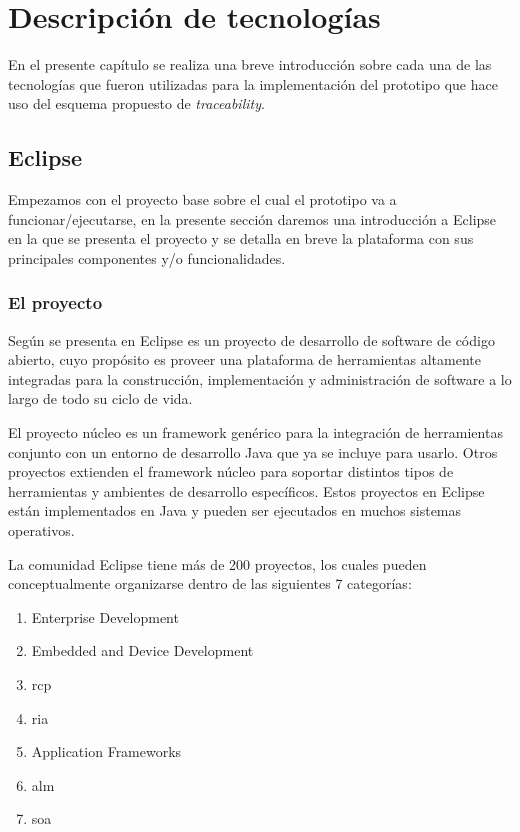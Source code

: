 \documentclass[a4paper,12pt,oneside,spanish]{book}
\begin{document}
\chapter{Descripción de tecnologías}

En el presente capítulo se realiza una breve introducción sobre cada una de las tecnologías que fueron utilizadas para la implementación del prototipo que hace uso del esquema propuesto de \textit{traceability}.


\section{Eclipse}

Empezamos con el proyecto base sobre el cual el prototipo va a funcionar/ejecutarse, en la presente sección daremos una introducción a Eclipse en la que se presenta el proyecto y se detalla en breve la plataforma con sus principales componentes y/o funcionalidades.


\subsection{El proyecto}

Según se presenta en \cite{EMFADG, Eclipse} Eclipse es un proyecto de desarrollo de software de código abierto, cuyo propósito es proveer una plataforma de herramientas altamente integradas para la construcción, implementación y administración de software a lo largo de todo su ciclo de vida.

El proyecto núcleo es un framework genérico para la integración de herramientas conjunto con un entorno de desarrollo Java que ya se incluye para usarlo. Otros proyectos extienden el framework núcleo para soportar distintos tipos de herramientas y ambientes de desarrollo específicos. Estos proyectos en Eclipse están implementados en Java y pueden ser ejecutados en muchos sistemas operativos.

La comunidad Eclipse tiene más de 200 proyectos, los cuales pueden conceptualmente organizarse dentro de las siguientes 7 categorías:

\begin{enumerate}

\item Enterprise Development

\item Embedded and Device Development

\item \gls{rcp}

\item \gls{ria}

\item Application Frameworks

\item \gls{alm}

\item \gls{soa}

\end{enumerate}
\end{document}
